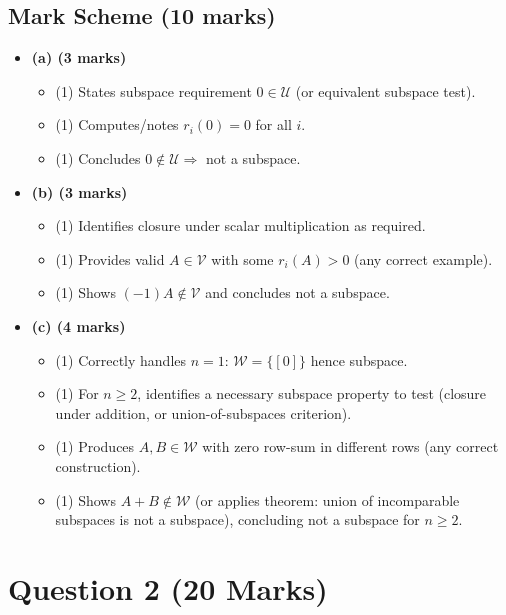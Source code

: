 \documentclass[12pt]{article}
\begin{document}
\subsection{Mark Scheme (10 marks)}
\begin{itemize}[leftmargin=1.6em]
  \item \textbf{(a) (3 marks)}
  \begin{itemize}[leftmargin=1.6em]
    \item (1) States subspace requirement $0\in\mathcal{U}$ (or equivalent subspace test).
    \item (1) Computes/notes $r_i(0)=0$ for all $i$.
    \item (1) Concludes $0\notin\mathcal{U}\Rightarrow$ not a subspace.
  \end{itemize}

  \item \textbf{(b) (3 marks)}
  \begin{itemize}[leftmargin=1.6em]
    \item (1) Identifies closure under scalar multiplication as required.
    \item (1) Provides valid $A\in\mathcal{V}$ with some $r_i(A)>0$ (any correct example).
    \item (1) Shows $(-1)A\notin\mathcal{V}$ and concludes not a subspace.
  \end{itemize}

  \item \textbf{(c) (4 marks)}
  \begin{itemize}[leftmargin=1.6em]
    \item (1) Correctly handles $n=1$: $\mathcal{W}=\{[0]\}$ hence subspace.
    \item (1) For $n\ge 2$, identifies a necessary subspace property to test (closure under addition, or union-of-subspaces criterion).
    \item (1) Produces $A,B\in\mathcal{W}$ with zero row-sum in different rows (any correct construction).
    \item (1) Shows $A+B\notin\mathcal{W}$ (or applies theorem: union of incomparable subspaces is not a subspace), concluding not a subspace for $n\ge 2$.
  \end{itemize}
\end{itemize}
\newpage
\section{Question 2 \hfill (20 Marks)}
\end{document}
